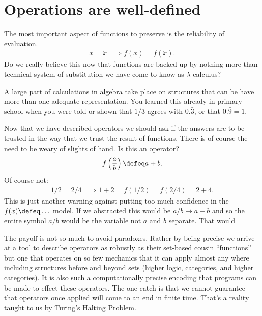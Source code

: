 
\section{Operations are well-defined}
The most important aspect of functions to preserve is the reliability of evaluation.
\begin{align*}
    x=\acute{x} & \Rightarrow f(x)=f(\acute{x}).
\end{align*}
Do we really believe this now that functions are backed up by nothing more
than technical system of substitution we have come to know as $\lambda$-calculus?


A large part of calculations in algebra take place on structures that 
can be have more than one adequate representation.  You learned this 
already in primary school when you were told or shown that
$1/3$ agrees with $0.\bar{3}$, or that $0.\bar{9}=1$. 



Now that we have described operators we should ask if the answers are 
to be trusted in the way that we trust the result of functions.
There is of course the need to be weary of slights of hand.
Is this an operator?
\begin{align*}
    f\left(\frac{a}{b}\right)\defeq a+b.
\end{align*}
Of course not:
\begin{align*}
    1/2 = 2/4 & \Rightarrow 1+2=f(1/2)=f(2/4)=2+4.
\end{align*}
This is just another warning against putting too much confidence 
in the $f(x)\defeq\ldots$ model.  If we abstracted this would be 
$a/b\mapsto a+b$ and so the entire symbol $a/b$ would be the variable 
not $a$ and $b$ separate.  That would 

The payoff is not so much to avoid paradoxes.  Rather by being precise we arrive
at a tool to describe operators as robustly as their set-based cousin
``functions'' but one that operates on so few mechanics that it can apply almost
any where including structures before and beyond sets (higher logic, categories,
and higher categories).  It is also such a computationally precise encoding that
programs can be made to effect these operators. The one catch is that we cannot
guarantee that operators once applied will come to an end in finite time. That's
a reality taught to us by Turing's Halting Problem.

